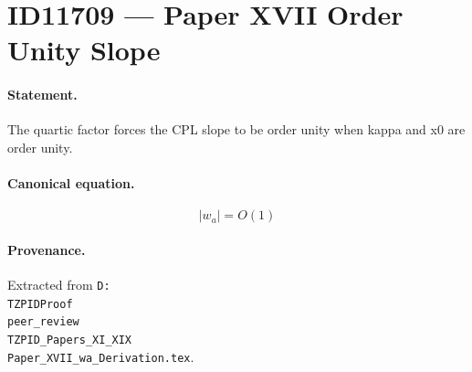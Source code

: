 \section*{ID11709 --- Paper XVII Order Unity Slope}

\paragraph{Statement.}
The quartic factor forces the CPL slope to be order unity when kappa and x0 are order unity.

\paragraph{Canonical equation.}
\[
|w_a|=O(1)
\]

\paragraph{Provenance.}
Extracted from \texttt{D:\\TZPIDProof\\peer\_review\\TZPID\_Papers\_XI\_XIX\\Paper\_XVII\_wa\_Derivation.tex}.
